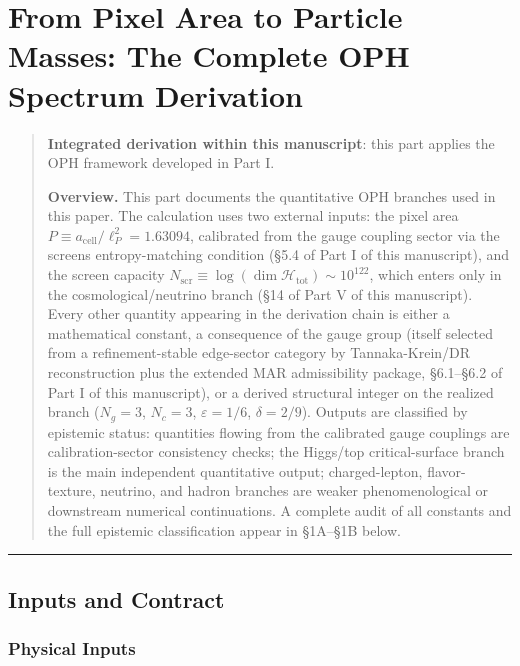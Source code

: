 \section{From Pixel Area to Particle Masses: The Complete OPH Spectrum Derivation}\label{from-pixel-area-to-particle-masses-the-complete-oph-spectrum-derivation}

\begin{quote}
\textbf{Integrated derivation within this manuscript}: this part applies the OPH framework developed in Part I.

\textbf{Overview.} This part documents the quantitative OPH branches used in this paper. The calculation uses two external inputs: the pixel area \(P \equiv a_{\text{cell}}/\ell_P^2 = 1.63094\), calibrated from the gauge coupling sector via the screen\textquotesingle s entropy-matching condition (\S{}5.4 of Part I of this manuscript), and the screen capacity \(N_{\mathrm{scr}} \equiv \log(\dim\mathcal{H}_{\text{tot}}) \sim 10^{122}\), which enters only in the cosmological/neutrino branch (\S{}14 of Part V of this manuscript). Every other quantity appearing in the derivation chain is either a mathematical constant, a consequence of the gauge group (itself selected from a refinement-stable edge-sector category by Tannaka-Krein/DR reconstruction plus the extended MAR admissibility package, \S{}6.1--\S{}6.2 of Part I of this manuscript), or a derived structural integer on the realized branch (\(N_g = 3\), \(N_c = 3\), \(\varepsilon = 1/6\), \(\delta = 2/9\)). Outputs are classified by epistemic status: quantities flowing from the calibrated gauge couplings are calibration-sector consistency checks; the Higgs/top critical-surface branch is the main independent quantitative output; charged-lepton, flavor-texture, neutrino, and hadron branches are weaker phenomenological or downstream numerical continuations. A complete audit of all constants and the full epistemic classification appear in \S{}1A--\S{}1B below.
\end{quote}

\begin{center}\rule{0.5\linewidth}{0.5pt}\end{center}

\subsection{Inputs and Contract}\label{1-inputs-and-contract}

\subsubsection{Physical Inputs}\label{11-physical-inputs}

